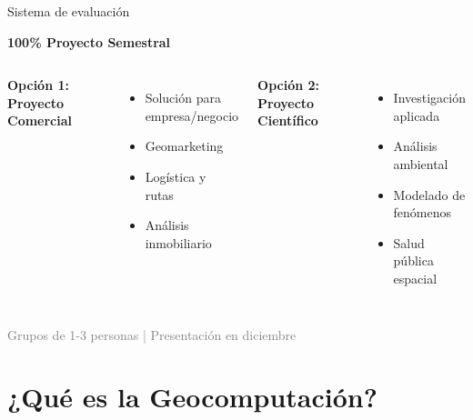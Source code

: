 \documentclass[10pt]{beamer}
\begin{document}
\begin{frame}{Sistema de evaluación}
    \begin{center}
        \Large{\textcolor{usachred}{\textbf{100\% Proyecto Semestral}}}
    \end{center}
    
    \vspace{0.5cm}
    
    \begin{columns}
        \textbf{Opción 1: Proyecto Comercial}
        \begin{itemize}
            \item Solución para empresa/negocio
            \item Geomarketing
            \item Logística y rutas
            \item Análisis inmobiliario
        \end{itemize}
        
        \textbf{Opción 2: Proyecto Científico}
        \begin{itemize}
            \item Investigación aplicada
            \item Análisis ambiental
            \item Modelado de fenómenos
            \item Salud pública espacial
        \end{itemize}
    \end{columns}
    
    \vspace{0.5cm}
    \begin{center}
        \textcolor{gray}{\small Grupos de 1-3 personas | Presentación en diciembre}
    \end{center}
\end{frame}

\section{¿Qué es la Geocomputación?}
\end{document}
